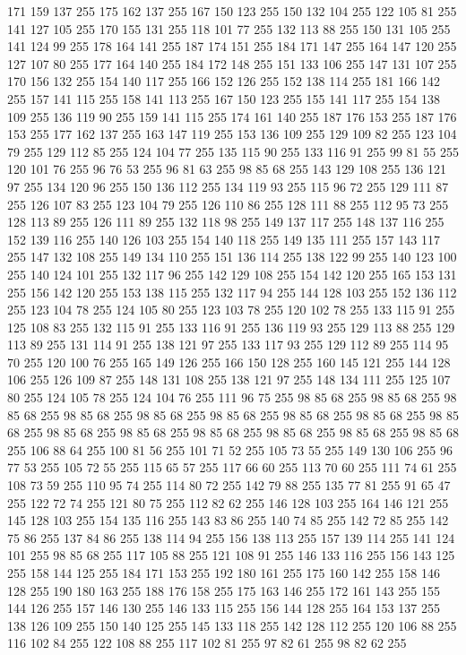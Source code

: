 171 159 137 255 175 162 137 255 167 150 123 255 150 132 104 255 122 105 81 255 141 127 105 255 170 155 131 255 118 101 77 255 132 113 88 255 150 131 105 255 141 124 99 255 178 164 141 255 187 174 151 255 184 171 147 255 164 147 120 255 127 107 80 255 177 164 140 255 184 172 148 255 151 133 106 255 147 131 107 255 170 156 132 255 154 140 117 255 166 152 126 255 152 138 114 255 181 166 142 255 157 141 115 255 158 141 113 255 167 150 123 255 155 141 117 255 154 138 109 255 136 119 90 255 159 141 115 255 174 161 140 255 187 176 153 255 187 176 153 255 177 162 137 255 163 147 119 255 153 136 109 255 129 109 82 255 123 104 79 255 129 112 85 255 124 104 77 255 135 115 90 255 133 116 91 255 99 81 55 255 120 101 76 255 96 76 53 255 96 81 63 255 98 85 68 255 143 129 108 255 136 121 97 255 134 120 96 255 150 136 112 255 134 119 93 255 115 96 72 255 129 111 87 255 126 107 83 255 123 104 79 255 126 110 86 255 128 111 88 255 112 95 73 255 128 113 89 255 126 111 89 255 132 118 98 255
149 137 117 255 148 137 116 255 152 139 116 255 140 126 103 255 154 140 118 255 149 135 111 255 157 143 117 255 147 132 108 255 149 134 110 255 151 136 114 255 138 122 99 255 140 123 100 255 140 124 101 255 132 117 96 255 142 129 108 255 154 142 120 255 165 153 131 255 156 142 120 255 153 138 115 255 132 117 94 255 144 128 103 255 152 136 112 255 123 104 78 255 124 105 80 255 123 103 78 255 120 102 78 255 133 115 91 255 125 108 83 255 132 115 91 255 133 116 91 255 136 119 93 255 129 113 88 255 129 113 89 255 131 114 91 255 138 121 97 255 133 117 93 255 129 112 89 255 114 95 70 255 120 100 76 255 165 149 126 255 166 150 128 255 160 145 121 255 144 128 106 255 126 109 87 255 148 131 108 255 138 121 97 255 148 134 111 255 125 107 80 255 124 105 78 255 124 104 76 255 111 96 75 255 98 85 68 255 98 85 68 255 98 85 68 255 98 85 68 255 98 85 68 255 98 85 68 255 98 85 68 255 98 85 68 255 98 85 68 255 98 85 68 255 98 85 68 255 98 85 68 255 98 85 68 255
98 85 68 255 98 85 68 255 106 88 64 255 100 81 56 255 101 71 52 255 105 73 55 255 149 130 106 255 96 77 53 255 105 72 55 255 115 65 57 255 117 66 60 255 113 70 60 255 111 74 61 255 108 73 59 255 110 95 74 255 114 80 72 255 142 79 88 255 135 77 81 255 91 65 47 255 122 72 74 255 121 80 75 255 112 82 62 255 146 128 103 255 164 146 121 255 145 128 103 255 154 135 116 255 143 83 86 255 140 74 85 255 142 72 85 255 142 75 86 255 137 84 86 255 138 114 94 255 156 138 113 255 157 139 114 255 141 124 101 255 98 85 68 255 117 105 88 255 121 108 91 255 146 133 116 255 156 143 125 255 158 144 125 255 184 171 153 255 192 180 161 255 175 160 142 255 158 146 128 255 190 180 163 255 188 176 158 255 175 163 146 255 172 161 143 255 155 144 126 255 157 146 130 255 146 133 115 255 156 144 128 255 164 153 137 255 138 126 109 255 150 140 125 255 145 133 118 255 142 128 112 255 120 106 88 255 116 102 84 255 122 108 88 255 117 102 81 255 97 82 61 255 98 82 62 255
